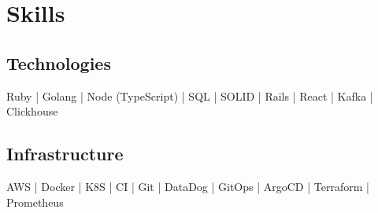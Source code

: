 
\section{Skills}
  \subsection{Technologies}
  Ruby | Golang | Node (TypeScript) | SQL | SOLID | Rails | React | Kafka | Clickhouse \\
  \subsection{Infrastructure}
  AWS | Docker | K8S | CI | Git | DataDog | GitOps | ArgoCD | Terraform | Prometheus \\
